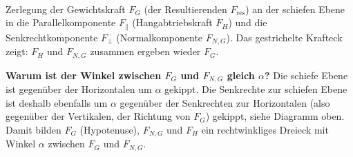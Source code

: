 \documentclass[addpoints,11pt,a4paper]{exam}
\begin{document}
\begin{theoriebox}
\begin{center}
\\[0.2em]
{\scriptsize Zerlegung der Gewichtskraft $F_G$ (der Resultierenden
$F_{\text{res}}$) an der schiefen Ebene in die Parallelkomponente
$F_\parallel$ (Hangabtriebskraft $F_H$) und die Senkrechtkomponente
$F_\perp$ (Normalkomponente $F_{N,G}$). Das gestrichelte Krafteck zeigt:
$F_H$ und $F_{N,G}$ zusammen ergeben wieder $F_G$.}
\end{center}

\textbf{Warum ist der Winkel zwischen $F_G$ und $F_{N,G}$ gleich
$\alpha$?} Die schiefe Ebene ist gegenüber der Horizontalen um $\alpha$
gekippt. Die Senkrechte zur schiefen Ebene ist deshalb ebenfalls um
$\alpha$ gegenüber der Senkrechten zur Horizontalen (also gegenüber der
Vertikalen, der Richtung von $F_G$) gekippt, siehe Diagramm oben. Damit
bilden $F_G$ (Hypotenuse), $F_{N,G}$ und $F_H$ ein rechtwinkliges Dreieck
mit Winkel $\alpha$ zwischen $F_G$ und $F_{N,G}$.


\end{theoriebox}
\end{document}
